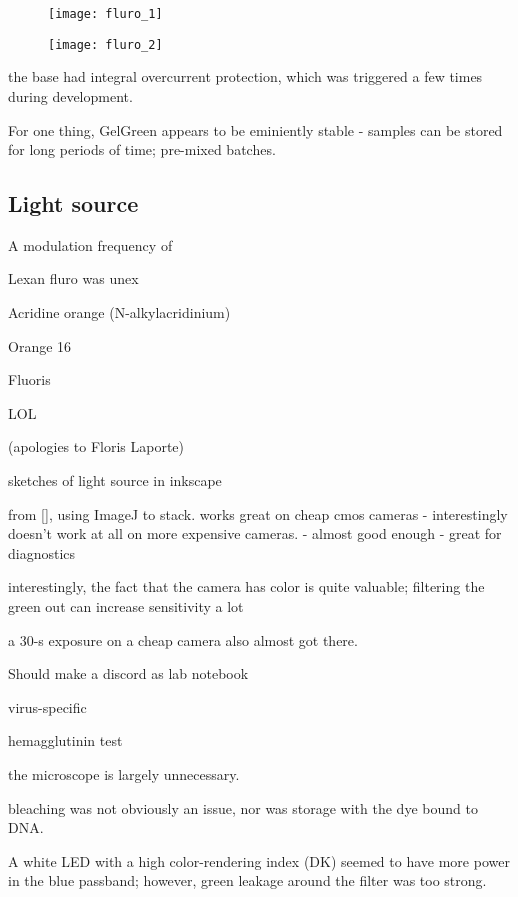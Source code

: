 \documentclass[paper.tex]{subfiles}
\begin{document}
\begin{figure}[H]
	\captionsetup{singlelinecheck = false, justification=justified}
	\centering
	\texttt{[image: fluro\_1]}
	\caption{}
\end{figure}

\begin{figure}[H]
	\captionsetup{singlelinecheck = false, justification=justified}
	\centering
	\texttt{[image: fluro\_2]}
	\caption{}
\end{figure}

the base had integral overcurrent protection, which was triggered a few times during development.

For one thing, GelGreen appears to be eminiently stable - samples can be stored for long periods of time; pre-mixed batches.

\subsection{Light source}

A modulation frequency of 

Lexan fluro was unex

Acridine orange (N-alkylacridinium)

Orange 16 

Fluoris
 
 LOL
 
(apologies to Floris Laporte)

sketches of light source in inkscape

from [], using ImageJ to stack. works great on cheap cmos cameras - interestingly doesn't work at all on more expensive cameras. - 
almost good enough - great for diagnostics

interestingly, the fact that the camera has color is quite valuable; filtering the green out can increase sensitivity a lot

a 30-s exposure on a cheap camera also almost got there.

Should make a discord as lab notebook


virus-specific

hemagglutinin test

the microscope is largely unnecessary. 


bleaching was not obviously an issue, nor was storage with the dye bound to DNA.


A white LED with a high color-rendering index (DK) seemed to have more power in the blue passband; however, green leakage around the filter was too strong. 
\end{document}
